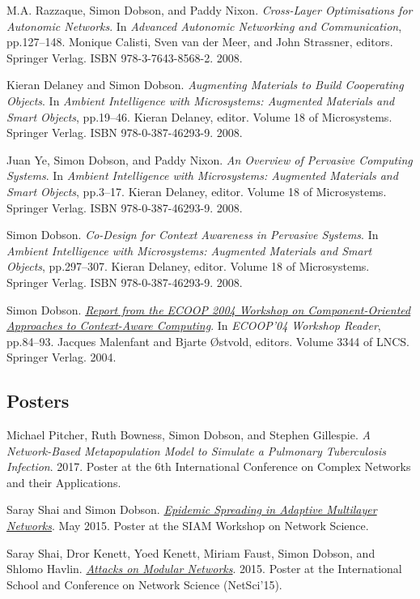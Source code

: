 \documentclass[11pt]{article}
\begin{document}
\label{orge85d77d}M.A. Razzaque, Simon Dobson, and Paddy Nixon.  \emph{Cross-Layer Optimisations for Autonomic Networks}. In \emph{Advanced Autonomic Networking and Communication}, pp.127–148. Monique Calisti, Sven van der Meer, and John Strassner, editors. Springer Verlag. ISBN 978-3-7643-8568-2. 2008.

\label{org8628b98}Kieran Delaney and Simon Dobson.  \emph{Augmenting Materials to Build Cooperating Objects}. In \emph{Ambient Intelligence with Microsystems: Augmented Materials and Smart Objects}, pp.19–46. Kieran Delaney, editor. Volume 18 of Microsystems. Springer Verlag. ISBN 978-0-387-46293-9. 2008.

\label{org6b456d1}Juan Ye, Simon Dobson, and Paddy Nixon.  \emph{An Overview of Pervasive Computing Systems}. In \emph{Ambient Intelligence with Microsystems: Augmented Materials and Smart Objects}, pp.3–17. Kieran Delaney, editor. Volume 18 of Microsystems. Springer Verlag. ISBN 978-0-387-46293-9. 2008.

\label{orgdc0d592}Simon Dobson.  \emph{Co-Design for Context Awareness in Pervasive Systems}. In \emph{Ambient Intelligence with Microsystems: Augmented Materials and Smart Objects}, pp.297–307. Kieran Delaney, editor. Volume 18 of Microsystems. Springer Verlag. ISBN 978-0-387-46293-9. 2008.

\label{orgb105a54}Simon Dobson.  \emph{\href{https://simondobson.org/softcopy/coacac-04.pdf}{Report from the ECOOP 2004 Workshop on Component-Oriented Approaches to Context-Aware Computing}}. In \emph{ECOOP’04 Workshop Reader}, pp.84–93. Jacques Malenfant and Bjarte Østvold, editors. Volume 3344 of LNCS. Springer Verlag. 2004.

\subsection{Posters}
\label{sec:orgae7e9d3}

\label{orgdfb16ca}Michael Pitcher, Ruth Bowness, Simon Dobson, and Stephen Gillespie.  \emph{A Network-Based Metapopulation Model to Simulate a Pulmonary Tuberculosis Infection}. 2017. Poster at the 6th International Conference on Complex Networks and their Applications.

\label{org68d5f45}Saray Shai and Simon Dobson.  \emph{\href{https://simondobson.org/softcopy/siam-networks-abstract-15.pdf}{Epidemic Spreading in Adaptive Multilayer Networks}}. May 2015. Poster at the SIAM Workshop on Network Science.

\label{orge7b37e1}Saray Shai, Dror Kenett, Yoed Kenett, Miriam Faust, Simon Dobson, and Shlomo Havlin.  \emph{\href{https://simondobson.org/softcopy/modular-network-attacks-netsci-15.pdf}{Attacks on Modular Networks}}. 2015. Poster at the International School and Conference on Network Science (NetSci’15).
\end{document}
